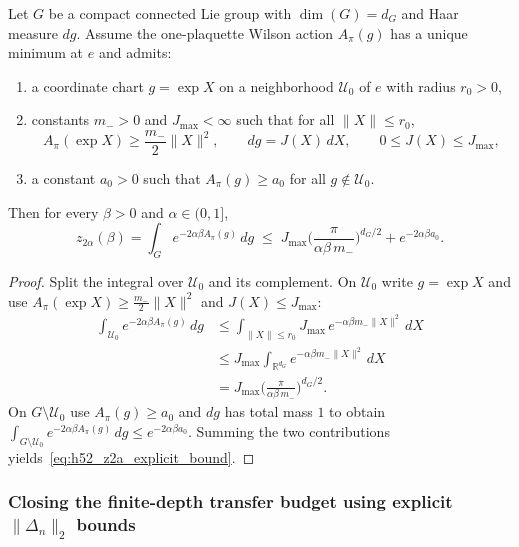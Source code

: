 \begin{lemma}
\label{lem:h52_z2a_explicit_bound}
Let $G$ be a compact connected Lie group with $\dim(G)=d_G$ and Haar measure $dg$.
Assume the one-plaquette Wilson action $A_\pi(g)$ has a unique minimum at $e$ and admits:
\begin{enumerate}
\item a coordinate chart $g=\exp X$ on a neighborhood $\mathcal U_0$ of $e$ with radius $r_0>0$,
\item constants $m_->0$ and $J_{\max}<\infty$ such that for all $\|X\|\le r_0$,
\[
A_\pi(\exp X)\ge \frac{m_-}{2}\|X\|^2,
\qquad
dg = J(X)\,dX,
\qquad
0\le J(X)\le J_{\max},
\]
\item a constant $a_0>0$ such that $A_\pi(g)\ge a_0$ for all $g\notin \mathcal U_0$.
\end{enumerate}
Then for every $\beta>0$ and $\alpha\in(0,1]$,
\begin{equation}
\label{eq:h52_z2a_explicit_bound}
z_{2\alpha}(\beta)
=
\int_G e^{-2\alpha\beta A_\pi(g)}\,dg
\;\le\;
J_{\max}\Big(\frac{\pi}{\alpha\beta\,m_-}\Big)^{d_G/2}
+
e^{-2\alpha\beta a_0}.
\end{equation}
\end{lemma}

\begin{proof}
Split the integral over $\mathcal U_0$ and its complement. On $\mathcal U_0$ write $g=\exp X$ and use
$A_\pi(\exp X)\ge \frac{m_-}{2}\|X\|^2$ and $J(X)\le J_{\max}$:
\[
\begin{aligned}
\int_{\mathcal U_0} e^{-2\alpha\beta A_\pi(g)}\,dg
&\le\int_{\|X\|\le r_0} J_{\max}\,e^{-\alpha\beta m_- \|X\|^2}\,dX\\
&\le J_{\max}\int_{\mathbb R^{d_G}} e^{-\alpha\beta m_- \|X\|^2}\,dX\\
&=J_{\max}\Big(\frac{\pi}{\alpha\beta\,m_-}\Big)^{d_G/2}.
\end{aligned}
\]
On $G\setminus\mathcal U_0$ use $A_\pi(g)\ge a_0$ and $dg$ has total mass $1$ to obtain
$\int_{G\setminus\mathcal U_0} e^{-2\alpha\beta A_\pi(g)}\,dg\le e^{-2\alpha\beta a_0}$.
Summing the two contributions yields~\eqref{eq:h52_z2a_explicit_bound}.
\end{proof}

\subsubsection{Closing the finite-depth transfer budget using explicit \texorpdfstring{$\|\Delta_n\|_2$}{||Delta\_n||\_2} bounds}
\label{sec:transfer_budget_closure}

